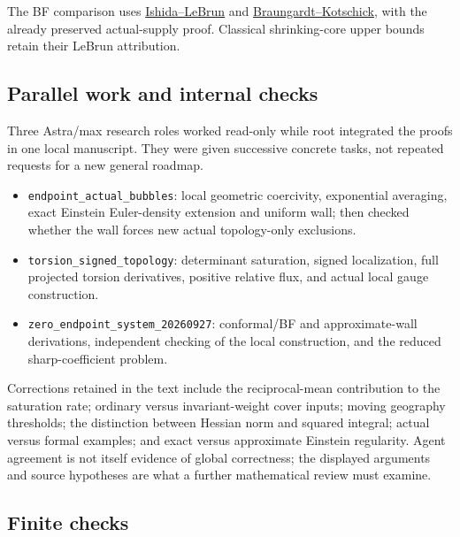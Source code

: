 \documentclass[
  10pt,
]{article}
\providecommand{\tightlist}{%
  \setlength{\itemsep}{0pt}\setlength{\parskip}{0pt}}
\begin{document}
The BF comparison uses
\href{https://arxiv.org/html/math/0111228}{Ishida--LeBrun} and
\href{https://arxiv.org/pdf/math/0306021}{Braungardt--Kotschick}, with
the already preserved actual-supply proof. Classical shrinking-core
upper bounds retain their LeBrun attribution.

\hypertarget{parallel-work-and-internal-checks}{%
\subsection{Parallel work and internal
checks}\label{parallel-work-and-internal-checks}}

Three Astra/max research roles worked read-only while root integrated
the proofs in one local manuscript. They were given successive concrete
tasks, not repeated requests for a new general roadmap.

\begin{itemize}
\tightlist
\item
  \nolinkurl{endpoint_actual_bubbles}: local geometric coercivity,
  exponential averaging, exact Einstein Euler-density extension and
  uniform wall; then checked whether the wall forces new actual
  topology-only exclusions.
\item
  \nolinkurl{torsion_signed_topology}: determinant saturation, signed
  localization, full projected torsion derivatives, positive relative
  flux, and actual local gauge construction.
\item
  \nolinkurl{zero_endpoint_system_20260927}: conformal/BF and
  approximate-wall derivations, independent checking of the local
  construction, and the reduced sharp-coefficient problem.
\end{itemize}

Corrections retained in the text include the reciprocal-mean
contribution to the saturation rate; ordinary versus invariant-weight
cover inputs; moving geography thresholds; the distinction between
Hessian norm and squared integral; actual versus formal examples; and
exact versus approximate Einstein regularity. Agent agreement is not
itself evidence of global correctness; the displayed arguments and
source hypotheses are what a further mathematical review must examine.

\hypertarget{finite-checks-1}{%
\subsection{Finite checks}\label{finite-checks-1}}
\end{document}
